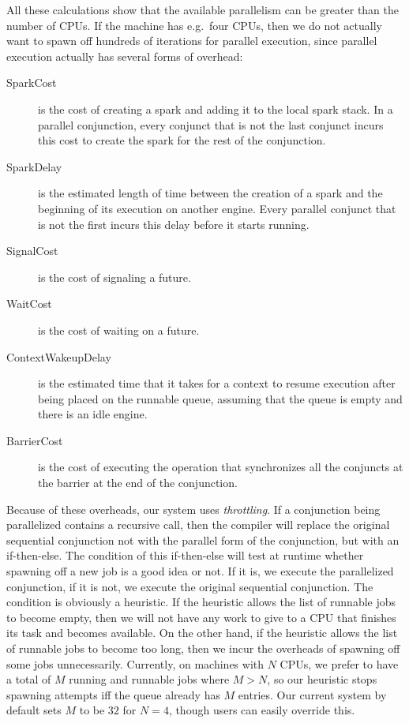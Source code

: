 All these calculations show that the available parallelism
can be greater than the number of CPUs.
If the machine has e.g.\ four CPUs,
then we do not actually want to spawn off
hundreds of iterations for parallel execution,
since parallel execution actually has several forms of overhead:

\begin{description}
\item[SparkCost]
is the cost of creating a spark and adding it to the local spark stack.
In a parallel conjunction,
every conjunct that is not the last conjunct incurs this cost
to create the spark for the rest of the conjunction.
\item[SparkDelay]
is the estimated length of time between the creation of a spark
and the beginning of its execution on another engine.
Every parallel conjunct that is not the first incurs this delay
before it starts running.
\item[SignalCost]
is the cost of signaling a future.
\item[WaitCost]
is the cost of waiting on a future.
\item[ContextWakeupDelay]
is the estimated time that it takes for a context to resume execution
after being placed on the runnable queue,
assuming that the queue is empty and there is an idle engine.
\item[BarrierCost]
is the cost of executing the operation
that synchronizes all the conjuncts at the barrier
at the end of the conjunction.
\end{description}

Because of these overheads, our system uses \emph{throttling}.
If a conjunction being parallelized contains a recursive call,
then the compiler will replace the original sequential conjunction
not with the parallel form of the conjunction,
but with an if-then-else.
The condition of this if-then-else
will test at runtime
whether spawning off a new job is a good idea or not.
If it is, we execute the parallelized conjunction,
if it is not, we execute the original sequential conjunction.
The condition is obviously a heuristic.
If the heuristic allows the list of runnable jobs to become empty,
then we will not have any work to give to a CPU
that finishes its task and becomes available.
On the other hand,
if the heuristic allows the list of runnable jobs to become too long,
then we incur the overheads of spawning off some jobs unnecessarily.
Currently, on machines with $N$ CPUs,
we prefer to have a total of $M$ running and runnable jobs where $M > N$,
so our heuristic stops spawning attempts
iff the queue already has $M$ entries.
Our current system by default sets $M$ to be $32$ for $N = 4$,
though users can easily override this.

